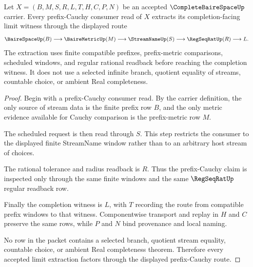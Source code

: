 \begin{theorem}
\label{thm:complete-baire-space-prefix-cauchy-limit}
Let $X=(B,M,S,R,L,T,H,C,P,N)$ be an accepted $\CompleteBaireSpaceUp$ carrier. Every prefix-Cauchy consumer read of $X$ extracts its completion-facing limit witness through the displayed route
$$
\BaireSpaceUp(B) \longrightarrow \BaireMetricUp(M) \longrightarrow \StreamNameUp(S) \longrightarrow \RegSeqRatUp(R) \longrightarrow L .
$$
The extraction uses finite compatible prefixes, prefix-metric comparisons, scheduled windows, and regular rational readback before reaching the completion witness. It does not use a selected infinite branch, quotient equality of streams, countable choice, or ambient Real completeness.
\end{theorem}
\begin{proof}
Begin with a prefix-Cauchy consumer read. By the carrier definition, the only source of stream data is the finite prefix row $B$, and the only metric evidence available for Cauchy comparison is the prefix-metric row $M$.

The scheduled request is then read through $S$. This step restricts the consumer to the displayed finite StreamName window rather than to an arbitrary host stream of choices.

The rational tolerance and radius readback is $R$. Thus the prefix-Cauchy claim is inspected only through the same finite windows and the same $\RegSeqRatUp$ regular readback row.

Finally the completion witness is $L$, with $T$ recording the route from compatible prefix windows to that witness. Componentwise transport and replay in $H$ and $C$ preserve the same rows, while $P$ and $N$ bind provenance and local naming.

No row in the packet contains a selected branch, quotient stream equality, countable choice, or ambient Real completeness theorem. Therefore every accepted limit extraction factors through the displayed prefix-Cauchy route.
\end{proof}

